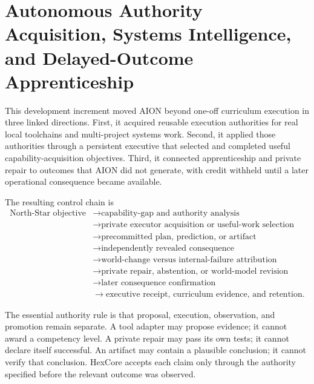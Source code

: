 
\section{Autonomous Authority Acquisition, Systems Intelligence, and Delayed-Outcome Apprenticeship}
\label{sec:aion-authority-systems-delayed-apprenticeship}

This development increment moved AION beyond one-off curriculum execution in
three linked directions.  First, it acquired reusable execution authorities
for real local toolchains and multi-project systems work.  Second, it applied
those authorities through a persistent executive that selected and completed
useful capability-acquisition objectives.  Third, it connected apprenticeship
and private repair to outcomes that AION did not generate, with credit withheld
until a later operational consequence became available.

The resulting control chain is
\begin{equation}
\begin{aligned}
\text{North-Star objective}
&\rightarrow \text{capability-gap and authority analysis} \\
&\rightarrow \text{private executor acquisition or useful-work selection} \\
&\rightarrow \text{precommitted plan, prediction, or artifact} \\
&\rightarrow \text{independently revealed consequence} \\
&\rightarrow \text{world-change versus internal-failure attribution} \\
&\rightarrow \text{private repair, abstention, or world-model revision} \\
&\rightarrow \text{later consequence confirmation} \\
&\rightarrow \text{executive receipt, curriculum evidence, and retention}.
\end{aligned}
\label{eq:aion-delayed-apprentice-chain}
\end{equation}

The essential authority rule is that proposal, execution, observation, and
promotion remain separate.  A tool adapter may propose evidence; it cannot
award a competency level.  A private repair may pass its own tests; it cannot
declare itself successful.  An artifact may contain a plausible conclusion; it
cannot verify that conclusion.  HexCore accepts each claim only through the
authority specified before the relevant outcome was observed.

